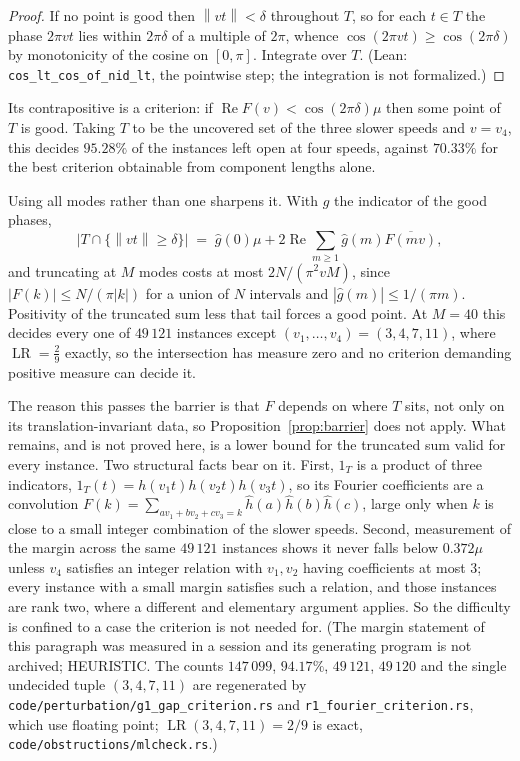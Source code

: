\documentclass[11pt]{amsart}
\theoremstyle{plain}
\theoremstyle{definition}
\newcommand{\LR}{\operatorname{LR}}
\newcommand{\nrm}[1]{\left\lVert #1 \right\rVert}
\begin{document}
\begin{proof}
If no point is good then $\nrm{vt}<\delta$ throughout $T$, so for each $t\in T$ the phase $2\pi vt$
lies within $2\pi\delta$ of a multiple of $2\pi$, whence $\cos(2\pi vt)\ge\cos(2\pi\delta)$ by
monotonicity of the cosine on $[0,\pi]$. Integrate over $T$. (Lean:
\texttt{cos\_lt\_cos\_of\_nid\_lt}, the pointwise step; the integration is not formalized.)
\end{proof}

Its contrapositive is a criterion: if $\operatorname{Re}F(v)<\cos(2\pi\delta)\mu$ then some point of
$T$ is good. Taking $T$ to be the uncovered set of the three slower speeds and $v=v_4$, this decides
$95.28\%$ of the instances left open at four speeds, against $70.33\%$ for the best criterion
obtainable from component lengths alone.

Using all modes rather than one sharpens it. With $g$ the indicator of the good phases,
\[
  \bigl|T\cap\{\nrm{vt}\ge\delta\}\bigr|
   \;=\;\hat g(0)\mu+2\operatorname{Re}\sum_{m\ge1}\hat g(m)\overline{F(mv)},
\]
and truncating at $M$ modes costs at most $2N/(\pi^2vM)$, since $|F(k)|\le N/(\pi|k|)$ for a union
of $N$ intervals and $|\hat g(m)|\le1/(\pi m)$. Positivity of the truncated sum less that tail
forces a good point. At $M=40$ this decides every one of $49\,121$ instances except
$(v_1,\dots,v_4)=(3,4,7,11)$, where $\LR=\tfrac29$ exactly, so the intersection has measure zero and
no criterion demanding positive measure can decide it.

The reason this passes the barrier is that $F$ depends on where $T$ sits, not only on its
translation-invariant data, so Proposition~\ref{prop:barrier} does not apply. What remains, and is
not proved here, is a lower bound for the truncated sum valid for every instance. Two structural
facts bear on it. First, $1_T$ is a product of three indicators, $1_T(t)=h(v_1t)h(v_2t)h(v_3t)$, so
its Fourier coefficients are a convolution
$F(k)=\sum_{av_1+bv_2+cv_3=k}\hat h(a)\hat h(b)\hat h(c)$, large only when $k$ is close to a small
integer combination of the slower speeds. Second, measurement of the margin across the same
$49\,121$ instances shows it never falls below $0.372\mu$ unless $v_4$ satisfies an integer relation
with $v_1,v_2$ having coefficients at most $3$; every instance with a small margin satisfies such a
relation, and those instances are rank two, where a different and elementary argument applies. So
the difficulty is confined to a case the criterion is not needed for. (The margin statement of this paragraph was measured in a session and its generating program is not archived; HEURISTIC. The counts $147\,099$, $94.17\%$, $49\,121$, $49\,120$ and the single undecided tuple $(3,4,7,11)$ are regenerated by \texttt{code/perturbation/g1\_gap\_criterion.rs} and \texttt{r1\_fourier\_criterion.rs}, which use floating point; $\LR(3,4,7,11)=2/9$ is exact, \texttt{code/obstructions/mlcheck.rs}.)
\end{document}
